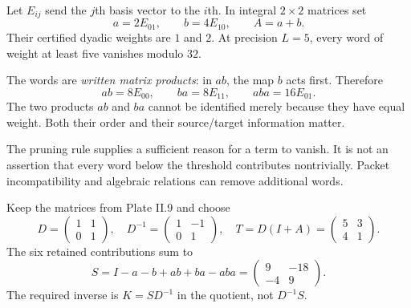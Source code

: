 Let $E_{ij}$ send the $j$th basis vector to the $i$th. In integral $2\times2$ matrices set
\[
a=2E_{01},\qquad b=4E_{10},\qquad A=a+b.
\]
Their certified dyadic weights are $1$ and $2$. At precision $L=5$, every word of weight at least five vanishes modulo $32$.


The words are \emph{written matrix products}: in $ab$, the map $b$ acts first. Therefore
\[
ab=8E_{00},\qquad ba=8E_{11},\qquad aba=16E_{01}.
\]
The two products $ab$ and $ba$ cannot be identified merely because they have equal weight. Both their order and their source/target information matter.

The pruning rule supplies a sufficient reason for a term to vanish. It is not an assertion that every word below the threshold contributes nontrivially. Packet incompatibility and algebraic relations can remove additional words.


Keep the matrices from Plate II.9 and choose
\[
D=\begin{pmatrix}1&1\\0&1\end{pmatrix},\quad
D^{-1}=\begin{pmatrix}1&-1\\0&1\end{pmatrix},\quad
T=D(I+A)=\begin{pmatrix}5&3\\4&1\end{pmatrix}.
\]
The six retained contributions sum to
\[
S=I-a-b+ab+ba-aba
=\begin{pmatrix}9&-18\\-4&9\end{pmatrix}.
\]
The required inverse is $K=SD^{-1}$ in the quotient, not $D^{-1}S$.

